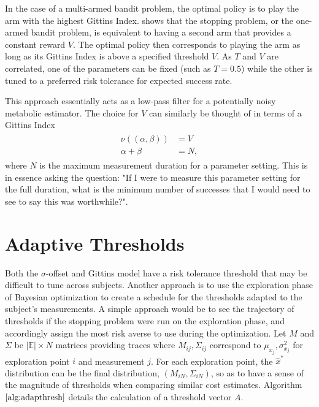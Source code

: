 In the case of a multi-armed bandit problem, the optimal policy is to play the arm with the highest Gittins Index. \citet{gelman2004bayesian} shows that the stopping problem, or the one-armed bandit problem, is equivalent to having a second arm that provides a constant reward $V$. The optimal policy then corresponds to playing the arm as long as its Gittins Index is above a specified threshold $V$. As $T$ and $V$ are correlated, one of the parameters can be fixed (such as $T=0.5$) while the other is tuned to a preferred risk tolerance for expected success rate. 

This approach essentially acts as a low-pass filter for a potentially noisy metabolic estimator. The choice for $V$ can similarly be thought of in terms of a Gittins Index 
\begin{align}
\begin{split}
  \nu((\alpha, \beta)) &= V\\
  \alpha + \beta &= N,
\end{split}
\end{align}
where $N$ is the maximum measurement duration for a parameter setting. This is in essence asking the question: "If I were to measure this parameter setting for the full duration, what is the minimum number of successes that I would need to see to say this was worthwhile?".

\section{Adaptive Thresholds}
Both the $\sigma$-offset and Gittins model have a risk tolerance threshold that may be difficult to tune across subjects. Another approach is to use the exploration phase of Bayesian optimization to create a schedule for the thresholds adapted to the subject's measurements. A simple approach would be to see the trajectory of thresholds if the stopping problem were run on the exploration phase, and accordingly assign the most risk averse to use during the optimization. Let $M$ and $\Sigma$ be $\vert \mathbb{E}\vert \times N$ matrices providing traces where $M_{ij}, \Sigma_{ij}$ correspond to $\mu_{x_j}, \sigma^2_{x_j}$ for exploration point $i$ and measurement $j$. For each exploration point, the $\hat{x}^*$ distribution can be the final distribution, $(M_{iN}, \Sigma_{iN})$, so as to have a sense of the magnitude of thresholds when comparing similar cost estimates. Algorithm $\ref{alg:adapthresh}$ details the calculation of a threshold vector $A$.

